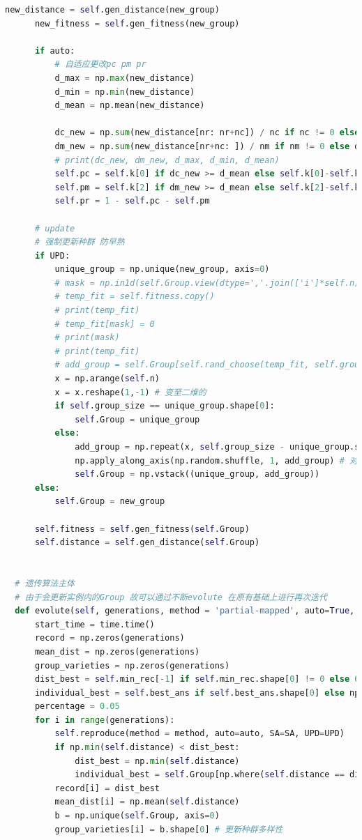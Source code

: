 \documentclass[12pt]{article}
\begin{document}
\begin{lstlisting}[language = Python, caption = GA算法计算TSP的类]
      new_distance = self.gen_distance(new_group)
      new_fitness = self.gen_fitness(new_group)
      
      if auto:
          # 自适应更改pc pm pr
          d_max = np.max(new_distance)
          d_min = np.min(new_distance)
          d_mean = np.mean(new_distance)

          dc_new = np.sum(new_distance[nr: nr+nc]) / nc if nc != 0 else d_mean
          dm_new = np.sum(new_distance[nr+nc: ]) / nm if nm != 0 else d_mean
          # print(dc_new, dm_new, d_max, d_min, d_mean)
          self.pc = self.k[0] if dc_new >= d_mean else self.k[0]-self.k[1]*(dc_new - d_min)/(d_mean - d_min)
          self.pm = self.k[2] if dm_new >= d_mean else self.k[2]-self.k[3]*(dm_new - d_min)/(d_mean - d_min)
          self.pr = 1 - self.pc - self.pm

      # update
      # 强制更新种群 防早熟
      if UPD:
          unique_group = np.unique(new_group, axis=0)
          # mask = np.in1d(self.Group.view(dtype=','.join(['i']*self.n)), unique_group.view(dtype=','.join(['i']*self.n)))
          # temp_fit = self.fitness.copy()
          # print(temp_fit)
          # temp_fit[mask] = 0
          # print(mask)
          # print(temp_fit)
          # add_group = self.Group[self.rand_choose(temp_fit, self.group_size - b.shape[0])]
          x = np.arange(self.n)
          x = x.reshape(1,-1) # 变至二维的
          if self.group_size == unique_group.shape[0]:
              self.Group = unique_group
          else:
              add_group = np.repeat(x, self.group_size - unique_group.shape[0], axis=0) # 复制若干次
              np.apply_along_axis(np.random.shuffle, 1, add_group) # 对每一行打乱
              self.Group = np.vstack((unique_group, add_group))
      else:
          self.Group = new_group

      self.fitness = self.gen_fitness(self.Group)
      self.distance = self.gen_distance(self.Group)
              
  
  # 遗传算法主体
  # 由于会更新实例内的Group 故可以通过不断evolute 在原有基础上进行再次迭代
  def evolute(self, generations, method = 'partial-mapped', auto=True, SA=False, UPD=True):
      start_time = time.time()
      record = np.zeros(generations)
      mean_dist = np.zeros(generations)
      group_varieties = np.zeros(generations)
      dist_best = self.min_rec[-1] if self.min_rec.shape[0] != 0 else 65535
      individual_best = self.best_ans if self.best_ans.shape[0] else np.zeros(self.n)
      percentage = 0.05
      for i in range(generations):
          self.reproduce(method = method, auto=auto, SA=SA, UPD=UPD)
          if np.min(self.distance) < dist_best:
              dist_best = np.min(self.distance)
              individual_best = self.Group[np.where(self.distance == dist_best)[0][0]]
          record[i] = dist_best
          mean_dist[i] = np.mean(self.distance)
          b = np.unique(self.Group, axis=0)
          group_varieties[i] = b.shape[0] # 更新种群多样性


\end{lstlisting}
\end{document}
